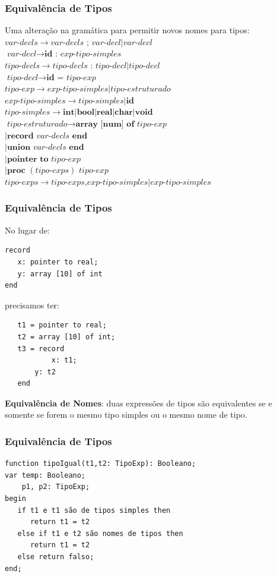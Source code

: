 \documentclass[table]{beamer}
\begin{document}
\begin{frame}
   \frametitle{Equivalência de Tipos}
   Uma alteração na gramática para permitir novos nomes para tipos: \\
   $\textit{var-decls}\to \textit{var-decls}\textbf{ ; }\textit{var-decl}|\textit{var-decl}$ \\
   $\textit{var-decl}\to \textbf{id : }\textit{exp-tipo-simples}$ \\
   $\textit{tipo-decls}\to \textit{tipo-decls}\textbf{ : } \textit{tipo-decl}|\textit{tipo-decl}$ \\
   $\textit{tipo-decl}\to \textbf{id = }\textit{tipo-exp}$ \\
   $\textit{tipo-exp}\to \textit{exp-tipo-simples}|\textit{tipo-estruturado}$ \\
   $\textit{exp-tipo-simples}\to \textit{tipo-simples}|\textbf{id}$ \\
   $\textit{tipo-simples}\to \textbf{int}|\textbf{bool}|\textbf{real}|\textbf{char}|\textbf{void}$ \\
   $\textit{tipo-estruturado}\to \textbf{array [num] of } \textit{tipo-exp }$ \\
   $|\textbf{record} \textit{ var-decls } \textbf{end}$ \\
   $|\textbf{union} \textit{ var-decls } \textbf{end}$ \\
   $|\textbf{pointer to} \textit{ tipo-exp}$ \\
   $|\textbf{proc } (\textit{tipo-exps}) \textit{ tipo-exp}$ \\
   $\textit{tipo-exps}\to \textit{tipo-exps}\textbf{,}\textit{exp-tipo-simples}|\textit{exp-tipo-simples}$
\end{frame}

\begin{frame}[fragile]
   \frametitle{Equivalência de Tipos}
   No lugar de:
   \begin{verbatim}
record 
   x: pointer to real;
   y: array [10] of int
end
   \end{verbatim}
   precisamos ter:
   \begin{verbatim}
   t1 = pointer to real;
   t2 = array [10] of int;
   t3 = record
           x: t1;
	   y: t2
   end
   \end{verbatim}
   \textbf{Equivalência de Nomes}: duas expressões de tipos são equivalentes se e somente se forem o mesmo tipo simples ou o mesmo nome de tipo.
\end{frame}

\begin{frame}[fragile]
   \frametitle{Equivalência de Tipos}
   \begin{verbatim}
function tipoIgual(t1,t2: TipoExp): Booleano;
var temp: Booleano;
    p1, p2: TipoExp;
begin
   if t1 e t1 são de tipos simples then
      return t1 = t2
   else if t1 e t2 são nomes de tipos then
      return t1 = t2
   else return falso;
end;
   \end{verbatim}
\end{frame}
\end{document}
